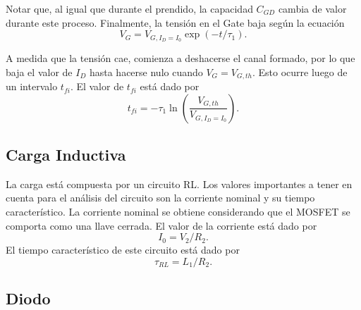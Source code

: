 \documentclass[e4_tp1_main.tex]{subfiles}
\begin{document}
Notar que, al igual que durante el prendido, la capacidad $C_{GD}$ cambia de valor durante este proceso. Finalmente, la tensión en el Gate baja según la ecuación
\begin{equation}
V_{G} = V_{G,I_D=I_0}\exp(-t/\tau_1).
\end{equation}

A medida que la tensión cae, comienza a deshacerse el canal formado, por lo que baja el valor de $I_D$ hasta hacerse nulo cuando $V_G=V_{G,th}$. Esto ocurre luego de un intervalo $t_{fi}$. El valor de $t_{fi}$ está dado por
\begin{equation}
t_{fi}= -\tau_1\ln\left(\frac{V_{G,th}}{V_{G,I_D=I_0}}\right).
\end{equation}

\subsection{Carga Inductiva}
La carga está compuesta por un circuito RL. Los valores importantes a tener en cuenta para el análisis del circuito son la corriente nominal y su tiempo característico. La corriente nominal se obtiene considerando que el MOSFET se comporta como una llave cerrada. El valor de la corriente está dado por
\begin{equation}
I_0 = V_2/R_2.
\end{equation}
El tiempo característico de este circuito está dado por
\begin{equation}
\tau_{RL} = L_1/R_2.
\end{equation}

\subsection{Diodo}
\end{document}
